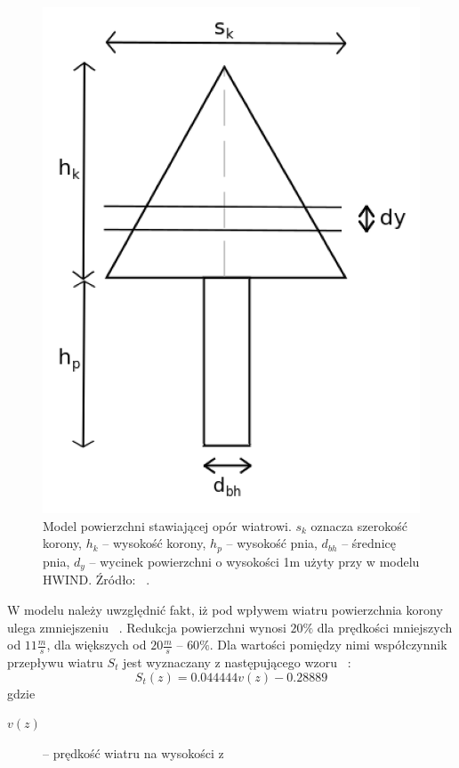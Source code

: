 \documentclass[a4paper,12pt]{article}
\begin{document}
\begin{figure}[!h]
	\center
	\includegraphics[scale=0.35]{HWIND2}
	\caption{Model powierzchni stawiającej opór wiatrowi. $s_k$ oznacza szerokość korony, $h_k$ -- wysokość korony, $h_p$ -- wysokość pnia, $d_{bh}$ -- średnicę pnia, $d_y$ -- wycinek powierzchni o wysokości 1m użyty przy w modelu HWIND. Źródło: ~\cite{chm_mgza}.}
	\label{fig:HWIND2}
\end{figure} 

W modelu należy uwzględnić fakt, iż pod wpływem wiatru powierzchnia korony ulega zmniejszeniu ~\cite{todo_jakies_zrodlo}. Redukcja powierzchni wynosi $20\%$ dla prędkości mniejszych od $11 \frac{m}{s}$, dla 
większych od $20\frac{m}{s}$ -- $60\%$. Dla wartości pomiędzy nimi współczynnik przepływu wiatru $S_t$ jest wyznaczany z następującego wzoru ~\cite{todo_inne_madre_zrodlo}:
$$ S_t(z) = 0.044444v(z) - 0.28889$$
gdzie
\begin{description}
  \item[$v(z)$] -- prędkość wiatru na wysokości z
\end{description}
\end{document}
